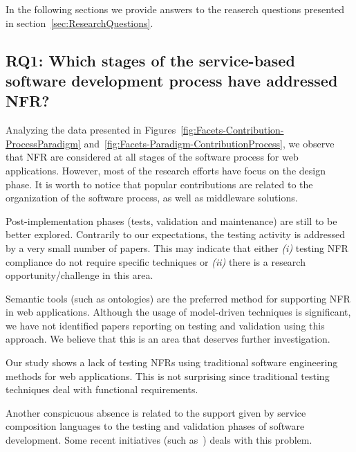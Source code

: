 
\bigskip

In the following sections we provide answers to the reaserch questions presented in section~\ref{sec:ResearchQuestions}.

\subsection{RQ1: Which stages of  the service-based software development process have addressed NFR?}

Analyzing the data presented in Figures~\ref{fig:Facets-Contribution-ProcessParadigm} and~\ref{fig:Facets-Paradigm-ContributionProcess}, we observe that NFR are considered at all stages of the software process for web applications.
However, most of the research efforts have focus on the design phase.
It is worth to notice that popular contributions are related to the organization of the software process, as well as middleware solutions.

Post-implementation phases (tests, validation and maintenance) are still to be better explored. 
Contrarily to our expectations, the testing activity is addressed by a very small number of papers.
This may indicate that either \textit{(i)} testing NFR compliance do not require specific techniques or \textit{(ii)} there is a research opportunity/challenge in this area.

Semantic tools (such as ontologies) are the preferred method for supporting NFR in web applications.
Although the usage of model-driven techniques is significant, we have not identified papers reporting on testing and validation using this approach. 
We believe that this is an area that deserves further investigation.

Our study shows a lack of testing NFRs using traditional software engineering methods for web applications.
This is not surprising since traditional testing techniques deal with functional requirements.

Another conspicuous absence is related to the support given by service composition languages to the testing and validation phases of software development. 
Some recent initiatives (such as~\cite{piSOD-M}) deals with this problem.



